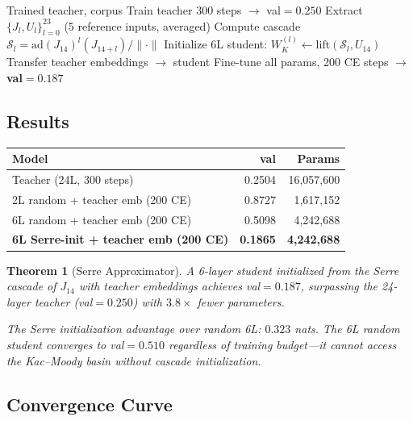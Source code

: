 \documentclass[11pt,a4paper]{article}
\newtheorem{theorem}{Theorem}
\begin{document}
\begin{algorithm}
\caption{Serre Cascade Approximator}
\begin{algorithmic}[1]
\Require Trained teacher, corpus
\State Train teacher 300 steps $\to$ val${=}0.250$
\State Extract $\{J_l, U_l\}_{l=0}^{23}$ (5 reference inputs, averaged)
\State Compute cascade $\mathcal{S}_l = \text{ad}(J_{14})^l(J_{14+l})/\|\cdot\|$
\State Initialize 6L student: $W_K^{(l)} \leftarrow \text{lift}(\mathcal{S}_l, U_{14})$
\State Transfer teacher embeddings $\to$ student
\State Fine-tune all params, 200 CE steps $\to$ \textbf{val${=}0.187$}
\end{algorithmic}
\end{algorithm}

\subsection{Results}

\begin{center}
\begin{tabular}{lrr}
\toprule
Model & val & Params \\
\midrule
Teacher (24L, 300 steps) & 0.2504 & 16,057,600 \\
2L random + teacher emb (200 CE) & 0.8727 & 1,617,152 \\
6L random + teacher emb (200 CE) & 0.5098 & 4,242,688 \\
\textbf{6L Serre-init + teacher emb (200 CE)} & \textbf{0.1865} & \textbf{4,242,688} \\
\bottomrule
\end{tabular}
\end{center}

\begin{theorem}[Serre Approximator]
A 6-layer student initialized from the Serre cascade of $J_{14}$ with
teacher embeddings achieves \emph{val${=}0.187$, surpassing the 24-layer
teacher} (val${=}0.250$) with $3.8{\times}$ fewer parameters.

The Serre initialization advantage over random 6L: $0.323$ nats.
The 6L random student converges to val${=}0.510$ regardless of training
budget---it cannot access the Kac--Moody basin without cascade initialization.
\end{theorem}

\subsection{Convergence Curve}
\end{document}
